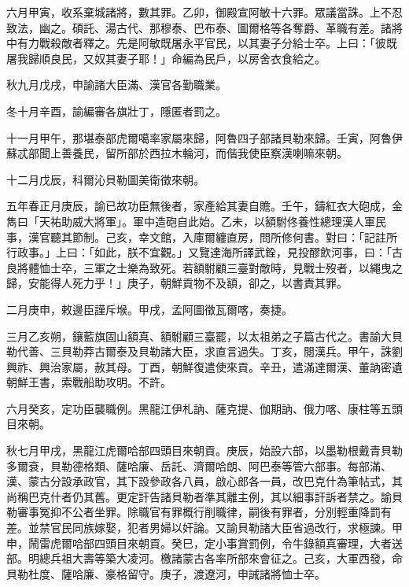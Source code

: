 \begin{pinyinscope}
六月甲寅，收系棄城諸將，數其罪。乙卯，御殿宣阿敏十六罪。眾議當誅。上不忍致法，幽之。碩託、湯古代、那穆泰、巴布泰、圖爾格等各奪爵、革職有差。諸將中有力戰殺敵者釋之。先是阿敏既屠永平官民，以其妻子分給士卒。上曰：「彼既屠我歸順良民，又奴其妻子耶！」命編為民戶，以房舍衣食給之。

秋九月戊戌，申諭諸大臣滿、漢官各勤職業。

冬十月辛酉，諭編審各旗壯丁，隱匿者罰之。

十一月甲午，那堪泰部虎爾噶率家屬來歸，阿魯四子部諸貝勒來歸。壬寅，阿魯伊蘇忒部聞上善養民，留所部於西拉木輪河，而偕我使臣察漢喇嘛來朝。

十二月戊辰，科爾沁貝勒圖美衛徵來朝。

五年春正月庚辰，諭已故功臣無後者，家產給其妻自贍。壬午，鑄紅衣大砲成，金雋曰「天祐助威大將軍」。軍中造砲自此始。乙未，以額駙佟養性總理漢人軍民事，漢官聽其節制。己亥，幸文館，入庫爾纏直房，問所修何書。對曰：「記註所行政事。」上曰：「如此，朕不宜觀。」又覽達海所譯武銓，見投醪飲河事，曰：「古良將體恤士卒，三軍之士樂為致死。若額駙顧三臺對敵時，見戰士歿者，以繩曳之歸，安能得人死力乎！」庚子，朝鮮貢物不及額，卻之，以書責其罪。

二月庚申，敕邊臣謹斥堠。甲戌，孟阿圖徵瓦爾喀，奏捷。

三月乙亥朔，鑲藍旗固山額真、額駙顧三臺罷，以太祖弟之子篇古代之。書諭大貝勒代善、三貝勒莽古爾泰及貝勒諸大臣，求直言過失。丁亥，閱漢兵。甲午，誅劉興祚、興治家屬，赦其母。丁酉，朝鮮復遣使來貢。辛丑，遣滿達爾漢、董訥密遺朝鮮王書，索戰船助攻明。不許。

六月癸亥，定功臣襲職例。黑龍江伊札訥、薩克提、伽期訥、俄力喀、康柱等五頭目來朝。

秋七月甲戌，黑龍江虎爾哈部四頭目來朝貢。庚辰，始設六部，以墨勒根戴青貝勒多爾袞，貝勒德格類、薩哈廉、岳託、濟爾哈朗、阿巴泰等管六部事。每部滿、漢、蒙古分設承政官，其下設參政各八員，啟心郎各一員，改巴克什為筆帖式，其尚稱巴克什者仍其舊。更定訐告諸貝勒者準其離主例，其以細事訐訴者禁之。諭貝勒審事冤抑不公者坐罪。除職官有罪概行削職律，嗣後有罪者，分別輕重降罰有差。並禁官民同族嫁娶，犯者男婦以奸論。又諭貝勒諸大臣省過改行，求極諫。甲申，鬧雷虎爾哈部四頭目來朝貢。癸巳，定小事賞罰例，令牛錄額真審理，大者送部。明總兵祖大壽等築大凌河。檄諸蒙古各率所部來會征之。己亥，大軍西發，命貝勒杜度、薩哈廉、豪格留守。庚子，渡遼河，申誡諸將恤士卒。


\end{pinyinscope}

